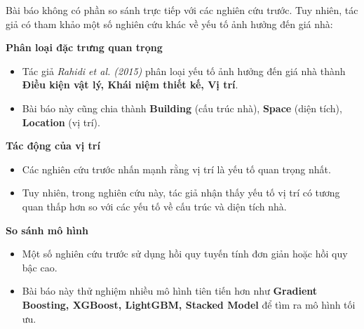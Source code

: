 Bài báo không có phần so sánh trực tiếp với các nghiên cứu trước. Tuy nhiên, tác giả có tham khảo một số nghiên cứu khác về yếu tố ảnh hưởng đến giá nhà:

\textbf{ Phân loại đặc trưng quan trọng}
\begin{itemize}
    \item Tác giả \textit{Rahidi et al. (2015)} phân loại yếu tố ảnh hưởng đến giá nhà thành \textbf{Điều kiện vật lý, Khái niệm thiết kế, Vị trí}.
    \item Bài báo này cũng chia thành \textbf{Building} (cấu trúc nhà), \textbf{Space} (diện tích), \textbf{Location} (vị trí).
\end{itemize}

\textbf{ Tác động của vị trí}
\begin{itemize}
    \item Các nghiên cứu trước nhấn mạnh rằng vị trí là yếu tố quan trọng nhất.
    \item Tuy nhiên, trong nghiên cứu này, tác giả nhận thấy yếu tố vị trí có tương quan thấp hơn so với các yếu tố về cấu trúc và diện tích nhà.
\end{itemize}

\textbf{ So sánh mô hình}
\begin{itemize}
    \item Một số nghiên cứu trước sử dụng hồi quy tuyến tính đơn giản hoặc hồi quy bậc cao.
    \item Bài báo này thử nghiệm nhiều mô hình tiên tiến hơn như \textbf{Gradient Boosting, XGBoost, LightGBM, Stacked Model} để tìm ra mô hình tối ưu.
\end{itemize}
